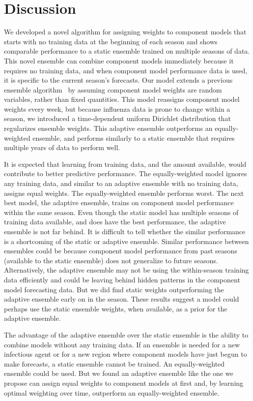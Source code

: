 \documentclass[sagev,times,Review,10pt]{sagej}
\begin{document}
\section{Discussion}

We developed a novel algorithm for assigning weights to component models that starts with no training data at the beginning of each season and shows comparable performance to a static ensemble trained on multiple seasons of data.
This novel ensemble can combine component models immediately because it requires no training data, and when component model performance data is used, it is specific to the current season's forecasts.
Our model extends a previous ensemble algorithm~\citep{reich2019collaborative} by assuming component model weights are random variables, rather than fixed quantities.
This model reassigns component model weights every week, but because influenza data is prone to change within a season, we introduced a time-dependent uniform Dirichlet distribution that regularizes ensemble weights. 
This adaptive ensemble outperforms an equally-weighted ensemble, and performs similarly to a static ensemble that requires multiple years of data to perform well.

It is expected that learning from training data, and the amount available, would contribute to better predictive performance.
The equally-weighted model ignores any training data, and similar to an adaptive ensemble with no training data, assigns equal weights.
The equally-weighted ensemble performs worst.
The next best model, the adaptive ensemble, trains on component model performance within the same season.
Even though the static model has multiple seasons of training data available, and does have the best performance, the adaptive ensemble is not far behind.
It is difficult to tell whether the similar performance is a shortcoming of the static or adaptive ensemble.
Similar performance between ensembles could be because component model performance from past seasons (available to the static ensemble) does not generalize to future seasons.
Alternatively, the adaptive ensemble may not be using the within-season training data efficiently and could be leaving behind hidden patterns in the component model forecasting data. 
But we did find static weights outperforming the adaptive ensemble early on in the season.
These results suggest a model could perhaps use the static ensemble weights, when available, as a prior for the adaptive ensemble.

The advantage of the adaptive ensemble over the static ensemble is the ability to combine models without any training data.
If an ensemble is needed for a new infectious agent or for a new region where component models have just begun to make forecasts, a static ensemble cannot be trained.
An equally-weighted ensemble could be used.
But we found an adaptive ensemble like the one we propose can assign equal weights to component models at first and, by learning optimal weighting over time, outperform an equally-weighted ensemble.
\end{document}
